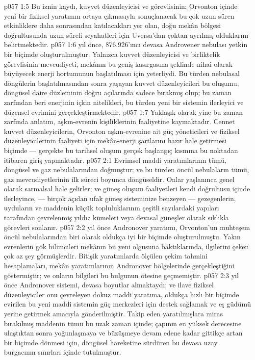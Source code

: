 \vs p057 1:5 Bu iznin kaydı, kuvvet düzenleyicisi ve görevlisinin; Orvonton içinde yeni bir fiziksel yaratımın ortaya çıkmasıyla sonuçlanacak bu çok uzun süren etkinliklere daha sonrasından katılacakları yer olan, doğu mekân bölgesi doğrultusunda uzun süreli seyahatleri için Uversa’dan çoktan ayrılmış olduklarını belirtmektedir.
\vs p057 1:6  yıl önce, 876.926’ıncı devasa Androvener nebulası yetkin bir biçimde oluşturulmuştur. Yalnızca kuvvet düzenleyicisi ve birliktelik görevlisinin mevcudiyeti, mekânın bu geniş kasırgasına şeklinde nihai olarak büyüyecek enerji hortumunun başlatılması için yeterliydi. Bu türden nebulasal döngülerin başlatılmasından sonra yaşayan kuvvet düzenleyicileri bu oluşumu, döngüsel daire düzleminin doğru açılarında sadece bırakmış olup; bu zaman zarfından beri enerjinin içkin nitelikleri, bu türden yeni bir sistemin ilerleyici ve düzensel evrimini gerçekleştirmektedir.
\vs p057 1:7 Yaklaşık olarak yine bu zaman zarfında anlatım, aşkın\hyp{}evrenin kişiliklerinin faaliyetine kaymaktadır. Cennet kuvvet düzenleyicilerin, Orvonton aşkın\hyp{}evrenine ait güç yöneticileri ve fiziksel düzenleyicilerinin faaliyeti için mekân\hyp{}enerji şartlarını hazır hale getirmesi biçimde --- gerçekte bu tarihsel oluşum gerçek başlangıç kısmına bu noktadan itibaren giriş yapmaktadır.
\vs p057 2:1 Evrimsel maddi yaratımlarının tümü, döngüsel ve gaz nebulalarından doğmuştur; ve bu türden öncül nebulaların tümü, gaz mevcudiyetlerinin ilk süreci boyunca döngüseldir. Onlar yaşlanınca genel olarak sarmalsal hale gelirler; ve güneş oluşum faaliyetleri kendi doğrultusu içinde ilerleyince, --- birçok açıdan ufak güneş sisteminize benzeyen --- gezegenlerin, uyduların ve maddenin küçük topluluklarının çeşitli sayılardaki yapıları tarafından çevrelenmiş yıldız kümeleri veya devasal güneşler olarak sıklıkla görevleri sonlanır.
\vs p057 2:2  yıl önce Andronover yaratımı, Orvonton’un muhteşem öncül nebulalarından biri olarak oldukça iyi bir biçimde oluşturulmuştu. Yakın evrenlerin gök bilimcileri mekânın bu yeni olgusuna baktıklarında, ilgilerini çeken çok az şey görmüşlerdir. Bitişik yaratımlarda ölçülen çekim tahmini hesaplamaları, mekân yaratımlarının Andronover bölgelerinde gerçekleştiğini göstermiştir; ve onların bilgileri bu bulgunun ötesine geçmemiştir.
\vs p057 2:3  yıl önce Andronover sistemi, devasa boyutlar almaktaydı; ve ilave fiziksel düzenleyiciler onu çevreleyen dokuz maddi yaratıma, oldukça hızlı bir biçimde evirilen bu yeni maddi sistemin güç merkezleri için destek sağlamak ve eş güdümü yerine getirmek amacıyla gönderilmiştir. Takip eden yaratılmışlara miras bırakılmış maddenin tümü bu uzak zaman içinde; çapının en yüksek derecesine ulaştıktan sonra yoğunlaşmaya ve büzüşmeye devam edene kadar gittikçe artan bir biçimde dönmesi için, döngüsel hareketine sürdüren bu devasa uzay burgacının sınırları içinde tutulmuştur.

